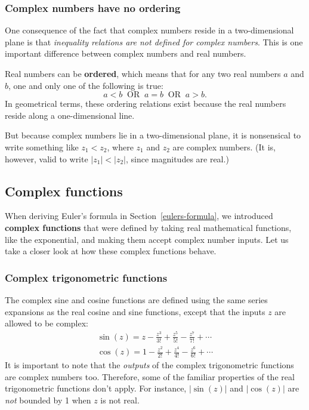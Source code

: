 \documentclass[10pt,a4paper]{article}
\begin{document}
\subsubsection{Complex numbers have no ordering}
\label{complex-numbers-have-no-ordering}

One consequence of the fact that complex numbers reside in a
two-dimensional plane is that \emph{inequality relations are not
  defined for complex numbers}. This is one important difference
between complex numbers and real numbers.

Real numbers can be \textbf{ordered}, which means that for any two real
numbers $a$ and $b$, one and only one of the following is true:
\begin{equation}
a < b \;\; \mathrm{OR} \;\; a = b \;\; \mathrm{OR}\;\; a > b.
\end{equation}
In geometrical terms, these ordering relations exist because the real
numbers reside along a one-dimensional line.

But because complex numbers lie in a two-dimensional plane, it is
nonsensical to write something like $z_1 < z_2$, where $z_1$ and
$z_2$ are complex numbers. (It is, however, valid to write
$|z_1| < |z_2|$, since magnitudes are real.)

\subsection{Complex functions}\label{complex-functions}

When deriving Euler's formula in Section~\ref{eulers-formula}, we
introduced \textbf{complex functions} that were defined by taking real
mathematical functions, like the exponential, and making them accept
complex number inputs. Let us take a closer look at how these complex
functions behave.

\subsubsection{Complex trigonometric functions}
\label{complex-trigonometric-functions}

The complex sine and cosine functions are defined using the same
series expansions as the real cosine and sine functions, except that
the inputs $z$ are allowed to be complex:
\begin{align}
  \sin(z) = z - \frac{z^3}{3!} + \frac{z^5}{5!} - \frac{z^7}{7!} + \cdots \\
  \cos(z) = 1 - \frac{z^2}{2!} + \frac{z^4}{4!} - \frac{z^6}{6!} + \cdots
\end{align}
It is important to note that the \emph{outputs} of the complex
trigonometric functions are complex numbers too. Therefore, some of
the familiar properties of the real trigonometric functions don't
apply. For instance, $|\sin(z)|$ and $|\cos(z)|$ are \emph{not}
bounded by 1 when $z$ is not real.
            
\end{document}
